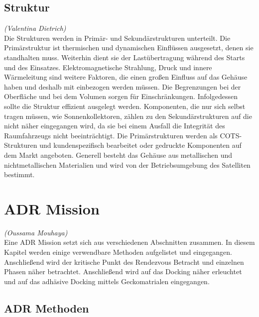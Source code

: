 		\subsection{Struktur}%
		\hfill\emph{(Valentina Dietrich)}\\
Die Strukturen werden in Primär- und Sekundärstrukturen unterteilt. Die Primärstruktur ist thermischen und dynamischen Einflüssen ausgesetzt, denen sie standhalten muss. Weiterhin dient sie der Lastübertragung während des Starts und des Einsatzes. Elektromagnetische Strahlung, Druck und innere Wärmeleitung sind weitere Faktoren, die einen großen Einfluss auf das Gehäuse haben und deshalb mit einbezogen werden müssen. Die Begrenzungen bei der Oberfläche und bei dem Volumen sorgen für Einschränkungen. Infolgedessen sollte die Struktur effizient ausgelegt werden. Komponenten, die nur sich selbst tragen müssen, wie Sonnenkollektoren, zählen zu den Sekundärstrukturen auf die nicht näher eingegangen wird, da sie bei einem Ausfall die Integrität des Raumfahrzeugs nicht beeinträchtigt. Die Primärstrukturen werden als COTS-Strukturen und kundenspezifisch bearbeitet oder gedruckte Komponenten auf dem Markt angeboten. Generell besteht das Gehäuse aus metallischen und nichtmetallischen Materialien und wird von der Betriebsumgebung des Satelliten bestimmt. \cite[S. 96 - 108]{NASA.Sota.2018} 

	\section{ADR Mission}
		\hfill\emph{(Oussama Mouhaya)}\\
Eine ADR Mission setzt sich aus verschiedenen Abschnitten zusammen. In diesem Kapitel werden einige verwendbare Methoden aufgelistet und eingegangen. Anschließend wird der kritische Punkt des Rendezvous Betracht und einzelnen Phasen näher betrachtet. Anschließend wird auf das Docking näher erleuchtet und auf das adhäsive Docking mittels Geckomatrialen  eingegangen. 
\subsection{ADR Methoden}
\label{ADRm}
	
